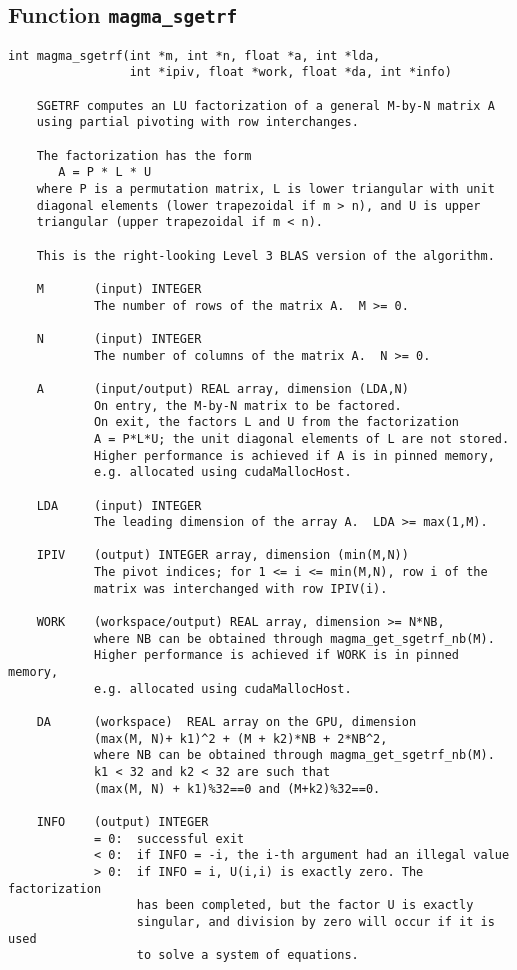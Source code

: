 \documentclass[10pt]{book}
\begin{document}
\subsection{Function {\tt {\bf magma\_sgetrf}}}
\begin{verbatim}
int magma_sgetrf(int *m, int *n, float *a, int *lda, 
                 int *ipiv, float *work, float *da, int *info)
                    
    SGETRF computes an LU factorization of a general M-by-N matrix A   
    using partial pivoting with row interchanges.   

    The factorization has the form   
       A = P * L * U   
    where P is a permutation matrix, L is lower triangular with unit   
    diagonal elements (lower trapezoidal if m > n), and U is upper   
    triangular (upper trapezoidal if m < n).   

    This is the right-looking Level 3 BLAS version of the algorithm.   

    M       (input) INTEGER   
            The number of rows of the matrix A.  M >= 0.   

    N       (input) INTEGER   
            The number of columns of the matrix A.  N >= 0.   

    A       (input/output) REAL array, dimension (LDA,N)   
            On entry, the M-by-N matrix to be factored.   
            On exit, the factors L and U from the factorization   
            A = P*L*U; the unit diagonal elements of L are not stored.   
            Higher performance is achieved if A is in pinned memory, 
            e.g. allocated using cudaMallocHost.

    LDA     (input) INTEGER   
            The leading dimension of the array A.  LDA >= max(1,M).   

    IPIV    (output) INTEGER array, dimension (min(M,N))   
            The pivot indices; for 1 <= i <= min(M,N), row i of the   
            matrix was interchanged with row IPIV(i).   

    WORK    (workspace/output) REAL array, dimension >= N*NB,
            where NB can be obtained through magma_get_sgetrf_nb(M).
            Higher performance is achieved if WORK is in pinned memory, 
            e.g. allocated using cudaMallocHost.

    DA      (workspace)  REAL array on the GPU, dimension 
            (max(M, N)+ k1)^2 + (M + k2)*NB + 2*NB^2,
            where NB can be obtained through magma_get_sgetrf_nb(M).
            k1 < 32 and k2 < 32 are such that 
            (max(M, N) + k1)%32==0 and (M+k2)%32==0.

    INFO    (output) INTEGER   
            = 0:  successful exit   
            < 0:  if INFO = -i, the i-th argument had an illegal value   
            > 0:  if INFO = i, U(i,i) is exactly zero. The factorization   
                  has been completed, but the factor U is exactly   
                  singular, and division by zero will occur if it is used   
                  to solve a system of equations.   
\end{verbatim}
\end{document}
